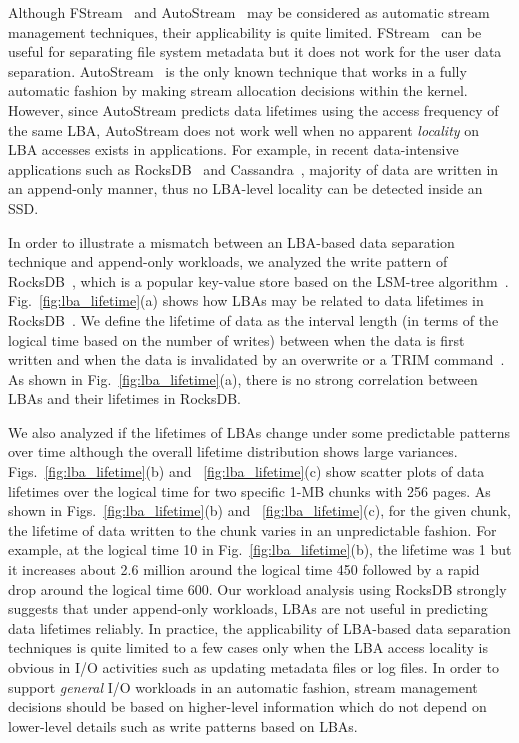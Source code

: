 Although \textsf{\small FStream}~\cite{FStream} and \textsf{\small AutoStream}~\cite{AutoStream}
may be considered 
as automatic stream management techniques,
their applicability is quite limited.
\textsf{\small FStream}~\cite{FStream} can be useful for separating file system metadata but it does not
work for the user data separation.
\textsf{\small AutoStream}~\cite{AutoStream} is the only known technique that works in a 
fully automatic fashion by making stream allocation decisions within 
the kernel.
However, since \textsf{\small AutoStream} predicts data lifetimes using the
access frequency of the same LBA, \textsf{\small AutoStream} does not work well 
when no apparent {\it locality} on LBA accesses exists in applications.  
For example, in recent data-intensive applications 
such as RocksDB~\cite{RocksDB} and Cassandra~\cite{Cassandra}, 
majority of data are written in an append-only manner,
thus no LBA-level locality can be detected inside an SSD.

In order to illustrate a mismatch between an LBA-based data separation technique and 
append-only workloads, we analyzed the write pattern of 
RocksDB~\cite{RocksDB}, which is a
popular key-value store based on the LSM-tree algorithm~\cite{LSM}.
Fig.~\ref{fig:lba_lifetime}(a) shows how LBAs may be related 
to data lifetimes in RocksDB~\cite{RocksDB}.  
We define the lifetime of data as the interval length (in terms of
the logical time based on the number of writes) between
when the data is first written and when the data is invalidated
by an overwrite or a TRIM command~\cite{TRIM}.
As shown in Fig.~\ref{fig:lba_lifetime}(a), 
there is no strong correlation between LBAs and their lifetimes in RocksDB.  

We also analyzed 
if the lifetimes of LBAs change under some predictable patterns over time 
although the overall lifetime distribution shows large variances.
Figs.~\ref{fig:lba_lifetime}(b) and ~\ref{fig:lba_lifetime}(c) show
scatter plots of data lifetimes over the logical time 
for two specific 1-MB chunks with 256 pages. 
As shown in Figs.~\ref{fig:lba_lifetime}(b) and ~\ref{fig:lba_lifetime}(c), 
for the given chunk, the lifetime of data written to the chunk 
varies in an unpredictable fashion.  
For example, at the logical time 10 in Fig.~\ref{fig:lba_lifetime}(b), 
the lifetime was 1 but it increases about 
2.6 million around the logical time 450 
followed by a rapid drop around the logical time 600. 
Our workload analysis using RocksDB strongly suggests that under append-only workloads, 
LBAs are not useful in predicting data lifetimes reliably.
In practice, the applicability of LBA-based data separation techniques is quite 
limited to a few cases only when the LBA access
locality is obvious in I/O activities such as updating metadata files or log files.  
In order to support {\it general} I/O workloads in an automatic fashion, stream 
management decisions should be based on higher-level information
which do not depend on lower-level details such as write patterns based on LBAs.

